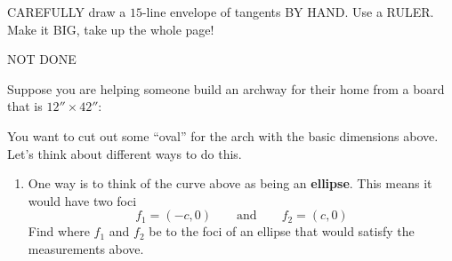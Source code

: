 \documentclass[noauthor,nooutcomes,hints]{ximera}
\begin{document}
\mynewpage






\begin{question}
  CAREFULLY draw a $15$-line envelope of tangents BY HAND. Use a
  RULER. Make it BIG, take up the whole page!
  \begin{freeResponse}
    NOT DONE
  \end{freeResponse}
\end{question}
\mynewpage





\begin{question}
  Suppose you are helping someone build an archway for their home from
  a board that is $12''\times 42''$:
  \begin{center}
  \end{center}
  You want to cut out some ``oval'' for the arch with the basic
  dimensions above. Let's think about different ways to do this.
  \begin{enumerate}
  \item One way is to think of the curve above as being an
    \textbf{ellipse}. This means it would have two foci
    \[
    f_1 = (-c,0) \qquad \text{and} \qquad f_2 = (c,0)
    \]
    Find where $f_1$ and $f_2$  be to the foci of an ellipse
    that would satisfy the measurements above.


\end{enumerate}
\end{question}
\end{document}
